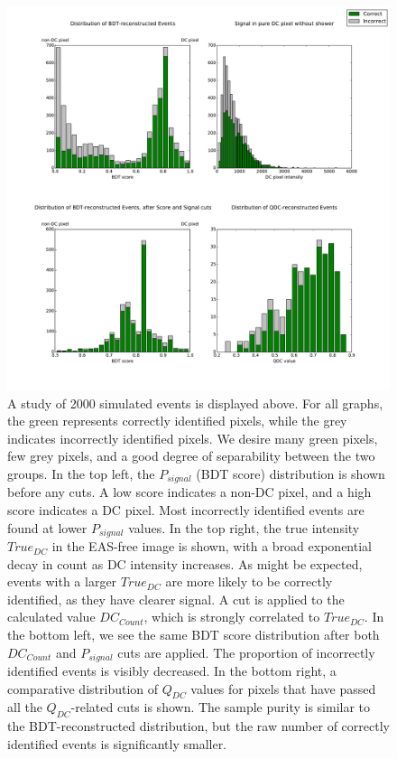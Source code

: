 \documentclass[]{article}
\begin{document}
\begin{figure}
\begin{center}
\includegraphics[width=\textwidth]{cutdistribution1None}
\caption{A study of 2000 simulated events is displayed above. For all graphs, the green represents correctly identified pixels, while the grey indicates incorrectly identified pixels. We desire many green pixels, few grey pixels, and a good degree of separability between the two groups. In the top left, the $P_{signal}$ (BDT score) distribution is shown before any cuts. A low score indicates a non-DC pixel, and a high score indicates a DC pixel. Most incorrectly identified events are found at lower $P_{signal}$ values. In the top right, the true intensity $True_{DC}$ in the EAS-free image is shown, with a broad exponential decay in count as DC intensity increases. As might be expected, events with a larger $True_{DC}$ are more likely to be correctly identified, as they have clearer signal. A cut is applied to the calculated value $DC_{Count}$, which is strongly correlated to $True_{DC}$. In the bottom left, we see the same BDT score distribution after both $DC_{Count}$ and $P_{signal}$ cuts are applied. The proportion of incorrectly identified events is visibly decreased. In the bottom right, a comparative distribution of $Q_{DC}$ values for pixels that have passed all the $Q_{DC}$-related cuts is shown. The sample purity is similar to the BDT-reconstructed distribution, but the raw number of correctly identified events is significantly smaller.}
\label{fig:cutdistribution}
\end{center}
\end{figure}
\end{document}
